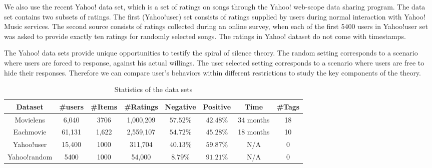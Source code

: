 \documentclass{sig-alternate}
\begin{document}
We also use the recent Yahoo! data set, which is a set of ratings on songs through the Yahoo! web-scope data sharing program. The data set contains two subsets of ratings. The first (Yahoo!user) set consists of ratings supplied by users during normal interaction with Yahoo! Music services. The second source consists of ratings collected during an online survey, when each of the first 5400 users in Yahoo!user set was asked to provide exactly ten ratings for randomly selected songs. The ratings in Yahoo! dataset do not come with timestamps.

The Yahoo! data sets provide unique opportunities to testify the spiral of silence theory.  The random setting corresponds to a scenario where users are forced to response, against his actual willings. The user selected setting corresponds to a scenario where users are free to hide their responses. Therefore we can compare user's behaviors within different restrictions to study the key components of the theory.
\begin{table}[htbp]
\centering
\caption{Statistics of the data sets}\label{tab:statistics}
\begin{tabular}{|c|c|c|c|c|c|c|c|}
\hline
Dataset &\#users & \#Items & \#Ratings & Negative & Positive  & Time & \#Tags\\\hline\hline
Movielens & 6,040 & 3706 & 1,000,209 & $57.52\%$ &$42.48\%$ & 34 months&18 \\\hline
Eachmovie & 61,131 & 1,622 & 2,559,107 & $54.72\%$ & $45.28\%$ &18 months &10 \\\hline
Yahoo!user & 15,400 & 1000 & 311,704 & $40.13\%$ & $59.87\%$ & N/A & 0\\\hline
Yahoo!random & 5400 &  1000 & 54,000 & $8.79\%$& $91.21\%$ &N/A & 0\\
\hline
\end{tabular}
\end{table}
\end{document}
